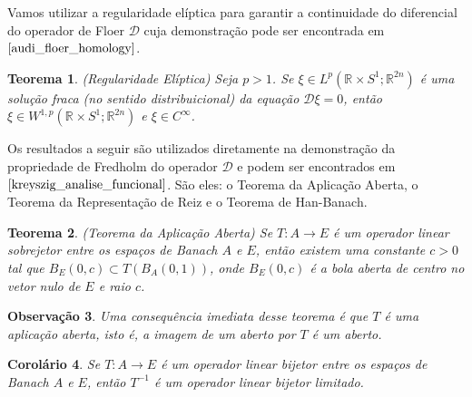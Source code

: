 \documentclass[12pt]{book}
\newtheorem{teorema}{Teorema}[section]
\newtheorem{corolario}[teorema]{Corolário}
\newtheorem{observacao}[teorema]{Observação}
\newenvironment{prova}[1]{$\square$ #1}{\hfill$\blacksquare$}
\newcommand{\circulo}{S^{1}}
\newcommand{\diferencialfloerabrev}{\mathcal{D}}
\newcommand{\derivada}[2]{\frac{d #1}{d #2}}
\newcommand{\espacoLpcontradominio}[2]{L^{p}(#1;#2)}
\newcommand{\espacosobolevcontradominio}[2]{W^{1,p}(#1;#2)}
\newcommand{\espacosobolevgeral}[2]{W^{1,#1}(#2)}
\newcommand{\retacartesianocirculo}{\real{} \times \circulo}
\newcommand{\real}[1]{\mathbb{R}^{#1}}
\begin{document}
	
	Vamos utilizar a regularidade elíptica para garantir a continuidade do diferencial do operador de Floer $\diferencialfloerabrev$ cuja demonstração pode ser encontrada em $\cite{audi_floer_homology}$.
	
	\begin{teorema}
		(Regularidade Elíptica) Seja $p> 1$. Se $\xi \in \espacoLpcontradominio{\retacartesianocirculo}{\real{2n}}$ é uma solução fraca (no sentido distribuicional) da equação $\diferencialfloerabrev\xi =0$, então $\xi \in \espacosobolevcontradominio{\retacartesianocirculo}{\real{2n}}$ e $\xi \in C^{\infty}$.
	\end{teorema} 
		
	Os resultados a seguir são utilizados diretamente na demonstração da propriedade de Fredholm do operador $\diferencialfloerabrev$ e podem ser encontrados em $\cite{kreyszig_analise_funcional}$. São eles: o Teorema da Aplicação Aberta, o Teorema da Representação de Reiz e o Teorema de Han-Banach.
	
	\begin{teorema}\label{teorema_aplicacao_aberta}
		(Teorema da Aplicação Aberta) Se $T : A \to E$ é um operador linear sobrejetor entre os espaços de Banach $A$ e $E$, então existem uma constante $c>0$ tal que $B_{E}(0,c) \subset T(B_{A}(0,1))$, onde $B_{E}(0,c) $ é a bola aberta de centro no vetor nulo de $E$ e raio $c$.
	\end{teorema}
	
	\begin{observacao}
		Uma consequência imediata desse teorema é que $T$ é uma aplicação aberta, isto é, a imagem de um aberto por $T$ é um aberto.
	\end{observacao}
	
	\begin{corolario}
		 Se $T : A \to E$ é um operador linear bijetor entre os espaços de Banach $A$ e $E$, então $T^{-1}$ é um operador linear bijetor limitado.
	\end{corolario}
	
\end{document}
